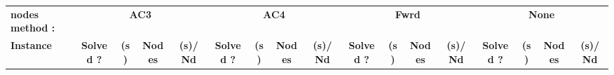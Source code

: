 \documentclass[main.tex]{subfiles}
\begin{document}
\thispagestyle{empty}

\begin{landscape}
\begin{center}
\renewcommand{\arraystretch}{1.4} 
\begin{tabular}{lcccccccccccccccc}
	\hline
\textbf{nodes method :} & \multicolumn{4}{c}{\textbf{AC3}} & \multicolumn{4}{c}{\textbf{AC4}} & \multicolumn{4}{c}{\textbf{Fwrd}} & \multicolumn{4}{c}{\textbf{None}}\\
\textbf{Instance}  & \textbf{Solved ?} & \textbf{(s)} & \textbf{Nodes} & \textbf{(s)/Nd} & \textbf{Solved ?} & \textbf{(s)} & \textbf{Nodes} & \textbf{(s)/Nd} & \textbf{Solved ?} & \textbf{(s)} & \textbf{Nodes} & \textbf{(s)/Nd} & \textbf{Solved ?} & \textbf{(s)} & \textbf{Nodes} & \textbf{(s)/Nd}\\\hline


\end{tabular}
\end{center}
\end{landscape}
\end{document}

